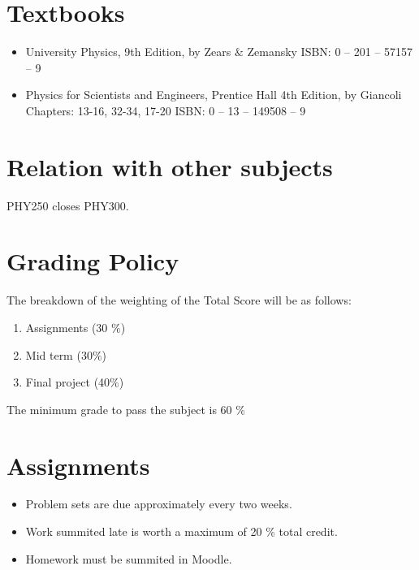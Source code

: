 \documentclass[12pt]{article}
\begin{document}

\section*{Textbooks}

\begin{itemize}
\item University Physics, 9th Edition, by  Zears $\&$ Zemansky
ISBN: 0 – 201 – 57157 – 9 
\item 
Physics for Scientists and Engineers, Prentice Hall 4th Edition, by Giancoli 
		Chapters:  13-16, 32-34, 17-20  
		ISBN: 0 – 13 – 149508 – 9 

\end{itemize}




\section*{Relation with other subjects}

PHY250 closes PHY300. 

\section*{Grading Policy}

The breakdown of the weighting of the Total Score will be as follows:

\begin{enumerate}
\item  	Assignments (30 $\%$)
\item   Mid term (30$\%$)
\item 	Final project (40$\%$)

\end{enumerate}

The minimum grade to pass the subject is 60 \% 



\section*{Assignments}

\begin{itemize}
	\item Problem sets are due approximately every two weeks. 
	\item  Work summited late is worth a maximum of 20 \% total credit.
	\item Homework must be summited in Moodle.
  \end{itemize}
  
\end{document}
